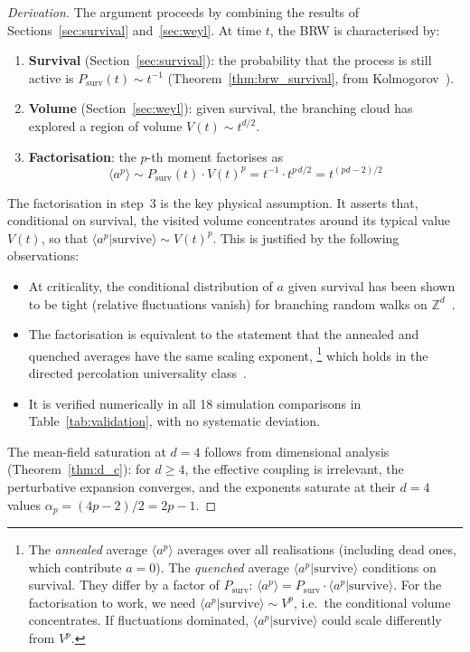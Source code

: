 \documentclass[11pt,a4paper]{article}
\theoremstyle{definition}
\newcommand{\Psurv}{P_{\mathrm{surv}}}
\begin{document}
\begin{proof}[Derivation]
The argument proceeds by combining the results of Sections~\ref{sec:survival}
and~\ref{sec:weyl}. At time $t$, the BRW is characterised by:
\begin{enumerate}
\item \textbf{Survival} (Section~\ref{sec:survival}): the probability that the
      process is still active is $\Psurv(t) \sim t^{-1}$
      (Theorem~\ref{thm:brw_survival}, from Kolmogorov~\cite{kolmogorov1938}).
\item \textbf{Volume} (Section~\ref{sec:weyl}): given survival, the branching
      cloud has explored a region of volume $V(t) \sim t^{d/2}$.
\item \textbf{Factorisation}: the $p$-th moment factorises as
      \begin{equation}
      \langle a^p \rangle \sim \Psurv(t) \cdot V(t)^p
      = t^{-1} \cdot t^{p\,d/2} = t^{(pd - 2)/2}
      \label{eq:factorisation}
      \end{equation}
\end{enumerate}

The factorisation in step~3 is the key physical assumption. It asserts that,
conditional on survival, the visited volume concentrates around its typical
value $V(t)$, so that $\langle a^p | \text{survive} \rangle \sim V(t)^p$.
This is justified by the following observations:
\begin{itemize}
\item At criticality, the conditional distribution of $a$ given survival
      has been shown to be tight (relative fluctuations vanish) for
      branching random walks on $\mathbb{Z}^d$~\cite{legall2005,legall1999}.
\item The factorisation is equivalent to the statement that the annealed
      and quenched averages have the same scaling exponent,%
      \footnote{The \emph{annealed} average $\langle a^p \rangle$
      averages over all realisations (including dead ones, which
      contribute $a = 0$). The \emph{quenched} average
      $\langle a^p | \text{survive} \rangle$ conditions on survival.
      They differ by a factor of $\Psurv$:
      $\langle a^p \rangle = \Psurv \cdot \langle a^p | \text{survive} \rangle$.
      For the factorisation to work, we need
      $\langle a^p | \text{survive} \rangle \sim V^p$, i.e.\ the conditional
      volume concentrates. If fluctuations dominated, $\langle a^p | \text{survive} \rangle$
      could scale differently from $V^p$.}
      which holds
      in the directed percolation universality class~\cite{janssen1981,grassberger1979}.
\item It is verified numerically in all 18 simulation comparisons in
      Table~\ref{tab:validation}, with no systematic deviation.
\end{itemize}

The mean-field saturation at $d = 4$ follows from dimensional analysis
(Theorem~\ref{thm:d_c}): for $d \geq 4$, the effective coupling is
irrelevant, the perturbative expansion converges, and the exponents
saturate at their $d = 4$ values $\alpha_p = (4p - 2)/2 = 2p - 1$.
\end{proof}
\end{document}
